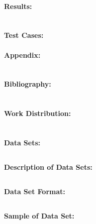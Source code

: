 \documentclass[11pt, oneside]{article}
\begin{document}
\pagebreak
\paragraph
{\bfseries Results:}

\section{}
\paragraph
{\bfseries Test Cases:}

\pagebreak
\paragraph
{\bfseries Appendix:}

\section{}
\paragraph
{\bfseries Bibliography:}

\section{}
\paragraph
{\bfseries Work Distribution:}

\section{}
\paragraph
{\bfseries Data Sets:}

\subsection{}
\paragraph
{\bfseries Description of Data Sets:}

\subsection{}
\paragraph
{\bfseries Data Set Format:}

\subsection{}
\paragraph
{\bfseries Sample of Data Set:}
\end{document}
